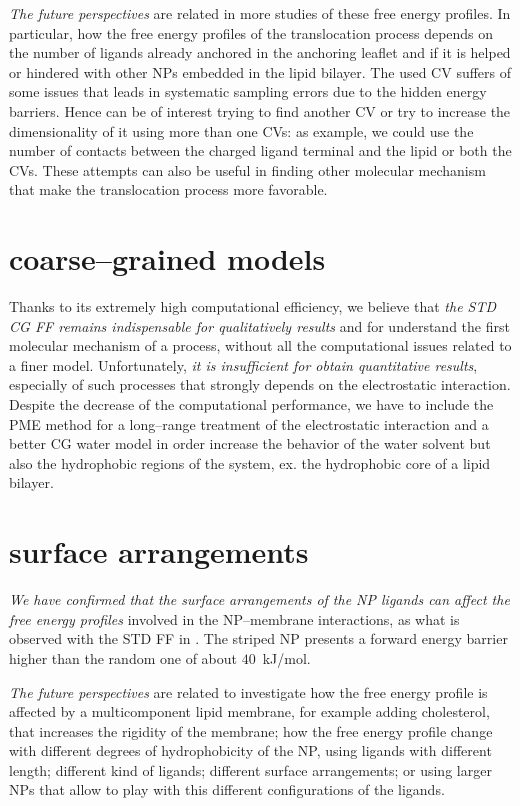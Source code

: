 \textit{The future perspectives} are related in more studies of these free energy profiles. In particular, how the free energy profiles of the translocation process depends on the number of ligands already anchored in the anchoring leaflet and if it is helped or hindered with other \acp{NP} embedded in the lipid bilayer. The used \ac{CV} suffers of some issues that leads in systematic sampling errors due to the hidden energy barriers. Hence can be of interest trying to find another \ac{CV} or try to increase the dimensionality of it using more than one \acp{CV}: as example, we could use the number of contacts between the charged ligand terminal and the lipid or both the \acp{CV}. These attempts can also be useful in finding other molecular mechanism that make the translocation process more favorable.

\section{coarse--grained models}
Thanks to its extremely high computational efficiency, we believe that \textit{the \ac{STD}} \martini \textit{\ac{CG} \ac{FF} remains indispensable for qualitatively results} and for understand the first molecular mechanism of a process, without all the computational issues related to a finer model. Unfortunately, \textit{it is insufficient for obtain quantitative results}, especially of such processes that strongly depends on the electrostatic interaction. Despite the decrease of the computational performance, we have to include the \ac{PME} method for a long--range treatment of the electrostatic interaction and a better \ac{CG} water model in order increase the behavior of the water solvent but also the hydrophobic regions of the system, ex. the hydrophobic core of a lipid bilayer. 

\section{surface arrangements}
\textit{We have confirmed that the surface arrangements of the \ac{NP} ligands can affect the free energy profiles} involved in the \ac{NP}--membrane interactions, as what is observed with the \ac{STD} \martini \ac{FF} in \cite{ourPaper}. The striped \ac{NP} presents a forward energy barrier higher than the random one of about $40$~kJ/mol. 

\textit{The future perspectives} are related to investigate how the free energy profile is affected by a multicomponent lipid membrane, for example adding cholesterol, that increases the rigidity of the membrane; how the free energy profile change with different degrees of hydrophobicity of the \ac{NP}, using ligands with different length; different kind of ligands; different surface arrangements; or using larger \acp{NP} that allow to play with this different configurations of the ligands.


\restoretoc
\endgroup